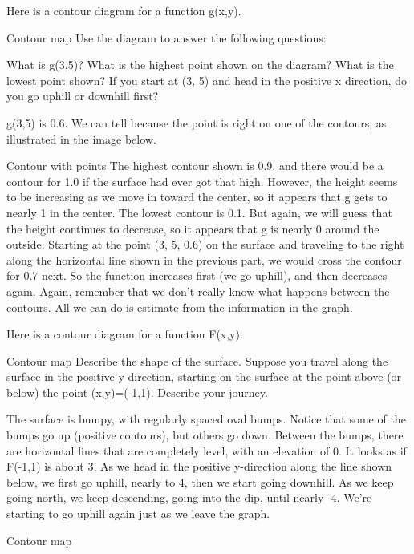 \begin{example}
Here is a contour diagram for a function g(x,y).

Contour map
Use the diagram to answer the following questions:

What is g(3,5)?
What is the highest point shown on the diagram? What is the lowest point shown?
If you start at (3, 5) and head in the positive x direction, do you go uphill or downhill first?

\begin{solution}
g(3,5) is 0.6. We can tell because the point is right on one of the contours, as illustrated in the image below.

Contour with points
The highest contour shown is 0.9, and there would be a contour for 1.0 if the surface had ever got that high. However, the height seems to be increasing as we move in toward the center, so it appears that g gets to nearly 1 in the center. The lowest contour is 0.1. But again, we will guess that the height continues to decrease, so it appears that g is nearly 0 around the outside.
Starting at the point (3, 5, 0.6) on the surface and traveling to the right along the horizontal line shown in the previous part, we would cross the contour for 0.7 next. So the function increases first (we go uphill), and then decreases again.
Again, remember that we don't really know what happens between the contours. All we can do is estimate from the information in the graph.
\end{solution}\end{example}

\begin{example}
Here is a contour diagram for a function F(x,y).

Contour map
Describe the shape of the surface.
Suppose you travel along the surface in the positive y-direction, starting on the surface at the point above (or below) the point (x,y)=(-1,1). Describe your journey.
\begin{solution}
  The surface is bumpy, with regularly spaced oval bumps. Notice that some of the bumps go up (positive contours), but others go down. Between the bumps, there are horizontal lines that are completely level, with an elevation of 0.
It looks as if F(-1,1) is about 3. As we head in the positive y-direction along the line shown below, we first go uphill, nearly to 4, then we start going downhill. As we keep going north, we keep descending, going into the dip, until nearly -4. We're starting to go uphill again just as we leave the graph.

Contour map
\end{solution}\end{example}

